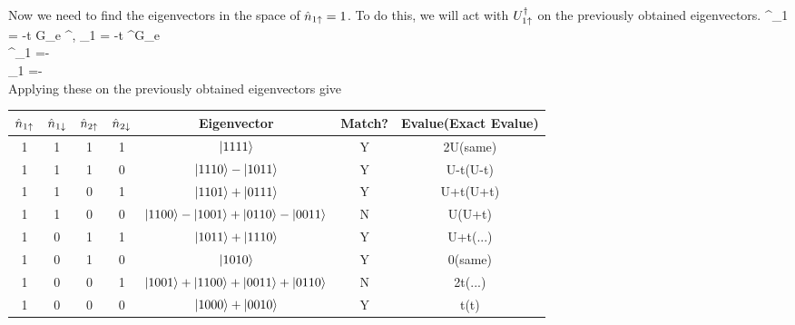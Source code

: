 \documentclass[12pt]{article}
\begin{document}
Now we need to find the eigenvectors in the space of \(\hat n_{1\uparrow}=1\). To do this, we will act with \(U^\dagger_{1\uparrow}\) on the previously obtained eigenvectors.
\beq
\eta^\dagger_{1\ua} = -t \hat G_e \ca^\dagger\cd, \; \eta_{1\ua} = -t \cd^\dagger\ca \hat G_e \\
\eta^\dagger_{1\ua} =- \\
\eta_{1\ua} =- \\
\eeq
Applying these on the previously obtained eigenvectors give \\
\begin{tabular}{c|c| c| c| c | c| c }
        \(\hat n_{1\uparrow}\) & \(\hat n_{1\downarrow}\)&\(\hat n_{2\uparrow}\)&\(\hat n_{2\downarrow}\)&Eigenvector& Match? & Evalue(Exact Evalue) \\
        \hline
        1 & 1 & 1 & 1 & \(\ket{1111}\) & Y & 2U(same) \\
        1 & 1 & 1 & 0 & \(\ket{1110}-\ket{1011}\) & Y & U-t(U-t) \\
        1 & 1 & 0 & 1 & \(\ket{1101}+\ket{0111}\) & Y & U+t(U+t) \\
        1 & 1 & 0 & 0 & \(\ket{1100}-\ket{1001}+\ket{0110}-\ket{0011}\) & N &  U(U+t) \\
        1 & 0 & 1 & 1 & \(\ket{1011}+\ket{1110}\) & Y & U+t(...) \\
        1 & 0 & 1 & 0 & \(\ket{1010}\) & Y & 0(same) \\
        1 & 0 & 0 & 1 & \(\ket{1001}+\ket{1100}+\ket{0011}+\ket{0110}\) & N & 2t(...) \\
        1 & 0 & 0 & 0 & \(\ket{1000} + \ket{0010}\) & Y & t(t) \\
\end{tabular}
\end{document}
